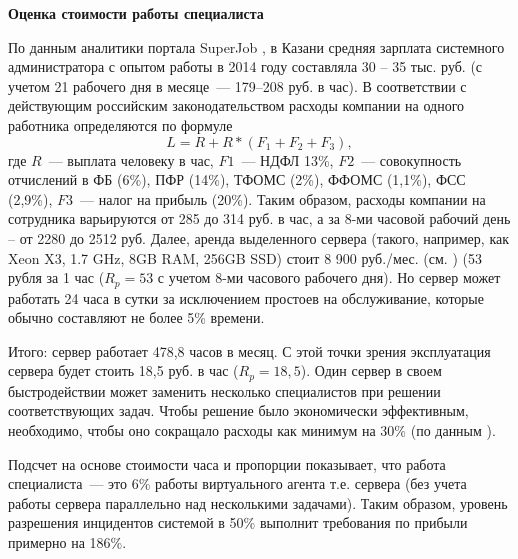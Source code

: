 \textbf{Оценка стоимости работы специалиста}\par По данным аналитики портала SuperJob \cite{SuperJob}, в Казани средняя зарплата системного администратора с опытом работы в 2014 году составляла 30 – 35 тыс. руб. (с учетом 21 рабочего дня в месяце~--- 179--208 руб. в час). В соответствии с действующим российским законодательством \cite{FiscalCodecs} расходы компании на одного работника определяются по формуле
\[
L = R + R*(F_1 +F_2+F_3),
\]
где $R$~--- выплата человеку в час, $F1$~--- НДФЛ 13\%, $F2$~--- совокупность отчислений в ФБ (6\%), ПФР (14\%), ТФОМС (2\%), ФФОМС (1,1\%), ФСС (2,9\%), $F3$~--- налог на прибыль (20\%). Таким образом, расходы компании на сотрудника варьируются от 285 до 314 руб. в час, а за 8-ми часовой рабочий день – от 2280 до 2512 руб. Далее, аренда выделенного сервера (такого, например, как Xeon X3, 1.7 GHz, 8GB RAM, 256GB SSD) стоит 8 900 руб./мес. (см. \cite{TimeWeb}) (53 рубля за 1 час ($R_p=53$ с учетом 8-ми часового рабочего дня). Но сервер может работать 24 часа в сутки за исключением простоев на обслуживание, которые обычно составляют не более 5\% времени. \par Итого: сервер работает 478,8 часов в месяц. С этой точки зрения эксплуатация сервера будет стоить 18,5 руб. в час ($R_p=18,5$). Один сервер в своем быстродействии может заменить несколько специалистов при решении соответствующих задач. Чтобы решение было экономически эффективным, необходимо, чтобы оно сокращало расходы как минимум на 30\% (по данным \icl). \par Подсчет на основе стоимости часа и пропорции показывает, что работа специалиста~--- это 6\% работы виртуального агента т.е. сервера (без учета работы сервера параллельно над несколькими задачами). Таким образом, уровень разрешения инцидентов системой в 50\% выполнит требования по прибыли примерно на 186\%.

